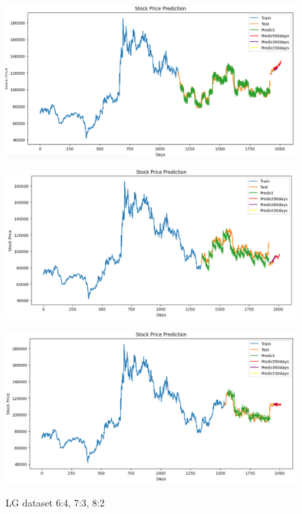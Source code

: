 \documentclass[conference]{IEEEtran}
\begin{document}
\begin{figure}[H]
    \centering
    \begin{minipage}{0.15\textwidth}
    \centering
    \includegraphics[width=1\textwidth]{Image/NBeat/N_BEAT_LG_6_4.png}
   
    \label{fig:1}
    \end{minipage}%
    \begin{minipage}{0.15\textwidth}
    \centering
    \includegraphics[width=1\textwidth]{Image/NBeat/N_BEAT_LG_7_3.png}
  
    \label{fig:2}
    \end{minipage}%
    \begin{minipage}{0.15\textwidth}
    \centering
    \includegraphics[width=1\textwidth]{Image/NBeat/N_BEAT_LG_8_2.png}

    \label{fig:3}
    \end{minipage}
    \caption{LG dataset 6:4, 7:3, 8:2}
\end{figure}
\end{document}
